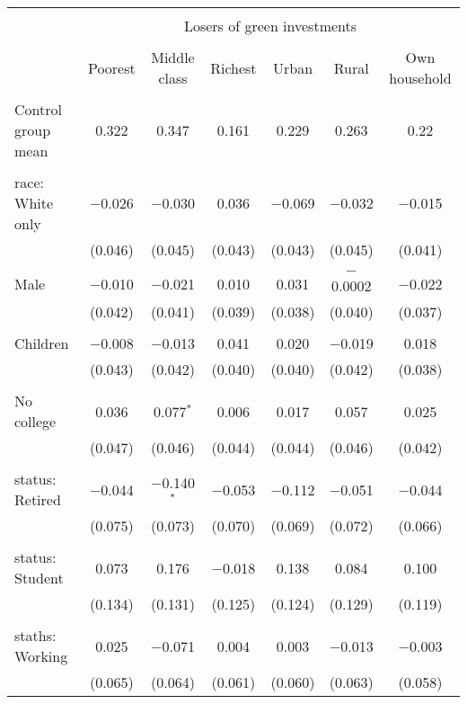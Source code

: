 
\begin{tabular}{@{\extracolsep{5pt}}lcccccc} 
\\[-1.8ex]\hline 
\hline \\[-1.8ex] 
 & \multicolumn{6}{c}{Losers of green investments} \\ 
\cline{2-7} 
\\[-1.8ex] & Poorest & Middle class & Richest & Urban & Rural & Own household \\ 
\hline \\[-1.8ex] 
 Control group mean & 0.322 & 0.347 & 0.161 & 0.229 & 0.263 & 0.22  \\ \hline \\[-1.8ex] race: White only & $-$0.026 & $-$0.030 & 0.036 & $-$0.069 & $-$0.032 & $-$0.015 \\ 
  & (0.046) & (0.045) & (0.043) & (0.043) & (0.045) & (0.041) \\ 
  & & & & & & \\ 
 Male & $-$0.010 & $-$0.021 & 0.010 & 0.031 & $-$0.0002 & $-$0.022 \\ 
  & (0.042) & (0.041) & (0.039) & (0.038) & (0.040) & (0.037) \\ 
  & & & & & & \\ 
 Children & $-$0.008 & $-$0.013 & 0.041 & 0.020 & $-$0.019 & 0.018 \\ 
  & (0.043) & (0.042) & (0.040) & (0.040) & (0.042) & (0.038) \\ 
  & & & & & & \\ 
 No college & 0.036 & 0.077$^{*}$ & 0.006 & 0.017 & 0.057 & 0.025 \\ 
  & (0.047) & (0.046) & (0.044) & (0.044) & (0.046) & (0.042) \\ 
  & & & & & & \\ 
 status: Retired & $-$0.044 & $-$0.140$^{*}$ & $-$0.053 & $-$0.112 & $-$0.051 & $-$0.044 \\ 
  & (0.075) & (0.073) & (0.070) & (0.069) & (0.072) & (0.066) \\ 
  & & & & & & \\ 
 status: Student & 0.073 & 0.176 & $-$0.018 & 0.138 & 0.084 & 0.100 \\ 
  & (0.134) & (0.131) & (0.125) & (0.124) & (0.129) & (0.119) \\ 
  & & & & & & \\ 
 staths: Working & 0.025 & $-$0.071 & 0.004 & 0.003 & $-$0.013 & $-$0.003 \\ 
  & (0.065) & (0.064) & (0.061) & (0.060) & (0.063) & (0.058) \\ 

\end{tabular}
